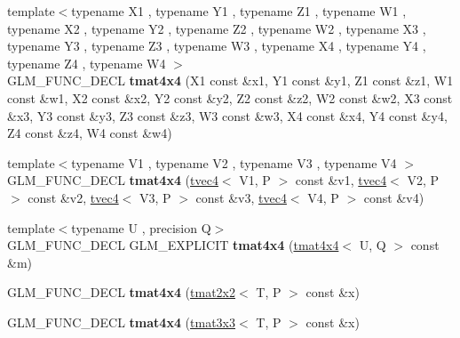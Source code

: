 \begin{DoxyCompactItemize}
\item 
\hypertarget{structglm_1_1tmat4x4_a21e75b577b5e9bf7a872de8820a383b8}{{\footnotesize template$<$typename X1 , typename Y1 , typename Z1 , typename W1 , typename X2 , typename Y2 , typename Z2 , typename W2 , typename X3 , typename Y3 , typename Z3 , typename W3 , typename X4 , typename Y4 , typename Z4 , typename W4 $>$ }\\G\-L\-M\-\_\-\-F\-U\-N\-C\-\_\-\-D\-E\-C\-L {\bfseries tmat4x4} (X1 const \&x1, Y1 const \&y1, Z1 const \&z1, W1 const \&w1, X2 const \&x2, Y2 const \&y2, Z2 const \&z2, W2 const \&w2, X3 const \&x3, Y3 const \&y3, Z3 const \&z3, W3 const \&w3, X4 const \&x4, Y4 const \&y4, Z4 const \&z4, W4 const \&w4)}\label{structglm_1_1tmat4x4_a21e75b577b5e9bf7a872de8820a383b8}

\item 
\hypertarget{structglm_1_1tmat4x4_a2e88247f4e213492fc372edce3c226a2}{{\footnotesize template$<$typename V1 , typename V2 , typename V3 , typename V4 $>$ }\\G\-L\-M\-\_\-\-F\-U\-N\-C\-\_\-\-D\-E\-C\-L {\bfseries tmat4x4} (\hyperlink{structglm_1_1tvec4}{tvec4}$<$ V1, P $>$ const \&v1, \hyperlink{structglm_1_1tvec4}{tvec4}$<$ V2, P $>$ const \&v2, \hyperlink{structglm_1_1tvec4}{tvec4}$<$ V3, P $>$ const \&v3, \hyperlink{structglm_1_1tvec4}{tvec4}$<$ V4, P $>$ const \&v4)}\label{structglm_1_1tmat4x4_a2e88247f4e213492fc372edce3c226a2}

\item 
\hypertarget{structglm_1_1tmat4x4_ab23da6e5a57ab5834de4be100480b406}{{\footnotesize template$<$typename U , precision Q$>$ }\\G\-L\-M\-\_\-\-F\-U\-N\-C\-\_\-\-D\-E\-C\-L G\-L\-M\-\_\-\-E\-X\-P\-L\-I\-C\-I\-T {\bfseries tmat4x4} (\hyperlink{structglm_1_1tmat4x4}{tmat4x4}$<$ U, Q $>$ const \&m)}\label{structglm_1_1tmat4x4_ab23da6e5a57ab5834de4be100480b406}

\item 
\hypertarget{structglm_1_1tmat4x4_afc366fae9e8a7a64309f216442dca89b}{G\-L\-M\-\_\-\-F\-U\-N\-C\-\_\-\-D\-E\-C\-L {\bfseries tmat4x4} (\hyperlink{structglm_1_1tmat2x2}{tmat2x2}$<$ T, P $>$ const \&x)}\label{structglm_1_1tmat4x4_afc366fae9e8a7a64309f216442dca89b}

\item 
\hypertarget{structglm_1_1tmat4x4_a7c6af7f8eda16d0e37e51deb5a8250cd}{G\-L\-M\-\_\-\-F\-U\-N\-C\-\_\-\-D\-E\-C\-L {\bfseries tmat4x4} (\hyperlink{structglm_1_1tmat3x3}{tmat3x3}$<$ T, P $>$ const \&x)}\label{structglm_1_1tmat4x4_a7c6af7f8eda16d0e37e51deb5a8250cd}


\end{DoxyCompactItemize}
